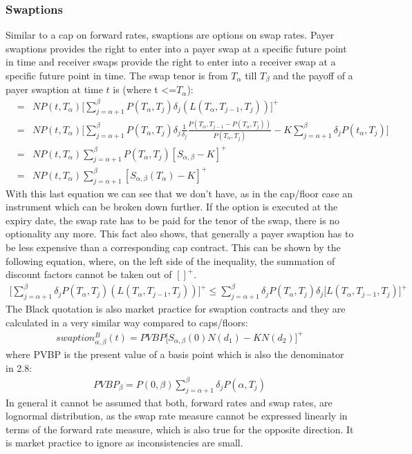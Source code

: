 \documentclass[11pt]{article}
\numberwithin{equation}{subsection}
\begin{document}
\subsubsection{Swaptions}
Similar to a cap on forward rates, swaptions are options on swap rates. Payer swaptions provides the right to enter into a payer swap at a specific future point in time and receiver swaps provide the right to enter into a receiver swap at a specific future point in time.
The swap tenor is from \(T_{\alpha}\) till \(T_{\beta}\) and the payoff of a payer swaption at time \(t\) is (where t <=\(T_{\alpha}\)):
\begin{eqnarray*}
	&=& N P(t, T_{\alpha}) \bigg[ \sum_{j=\alpha+1}^{\beta} P(T_{\alpha}, T_{j}) \delta_{j} (L(T_{\alpha}, T_{j-1}, T_{j})) \bigg]^{+}\\
	&=& N P(t, T_{\alpha}) \bigg[ \sum_{j=\alpha+1}^{\beta} P(T_{\alpha}, T_{j}) \delta_{j} \frac{1}{\delta_{j}} \frac{P(T_{\alpha}, T_{j-1}-P(T_{\alpha}, T_j))}{P(T_{\alpha}, T_j)} -K\sum_{j=\alpha+1}^{\beta} \delta_{j} P(t_{\alpha}, T_j) \bigg] \\
	&=& N P(t, T_{\alpha}) \sum_{j=\alpha+1}^{\beta} P(T_{\alpha}, T_{j}) [S_{\alpha, \beta}-K]^{+} \\
	&=& N P(t, T_{\alpha}) \sum_{j=\alpha+1}^{\beta} [S_{\alpha, \beta}(T_{\alpha})-K]^{+}
\end{eqnarray*}
With this last equation we can see that we don't have, as in the cap/floor case an instrument which can be broken down further. If the option is executed at the expiry date, the swap rate has to be paid for the tenor of the swap, there is no optionality any more. This fact also shows, that generally a payer swaption has to be less expensive than a corresponding cap contract. This can be shown by the following equation, where, on the left side of the inequality, the summation of discount factors cannot be taken out of \([]^{+}\).
\begin{eqnarray*}
	\Big[ \sum_{j=\alpha+1}^{\beta} \delta_{j} P(T_{\alpha}, T_{j}) (L(T_{\alpha}, T_{j-1}, T_{j})) \Big]^{+} \leq  \sum_{j=\alpha+1}^{\beta} \delta_{j} P(T_{\alpha}, T_{j}) \delta_{j} \Big[L(T_{\alpha}, T_{j-1}, T_{j})\Big]^{+}
\end{eqnarray*}
The Black quotation is also market practice for swaption contracts and they are calculated in a very similar way compared to caps/floors:
\begin{eqnarray*}
	swaption_{\alpha, \beta}^{B}(t) = PVBP\Big[S_{\alpha, \beta}(0) N(d_1)-KN(d_2)\Big]^{+}
\end{eqnarray*}
where PVBP is the present value of a basis point which is also the denominator in 2.8:
\begin{eqnarray*}
	PVBP_{\beta} = P(0, \beta) \sum_{j=\alpha+1}^{\beta} \delta_{j} P(\alpha, T_{j})
\end{eqnarray*}
In general it cannot be assumed that both, forward rates and swap rates, are lognormal distribution, as the swap rate measure cannot be expressed linearly in terms of the forward rate measure, which is also true for the opposite direction. It is market practice to ignore as inconsistencies are small.
\end{document}
